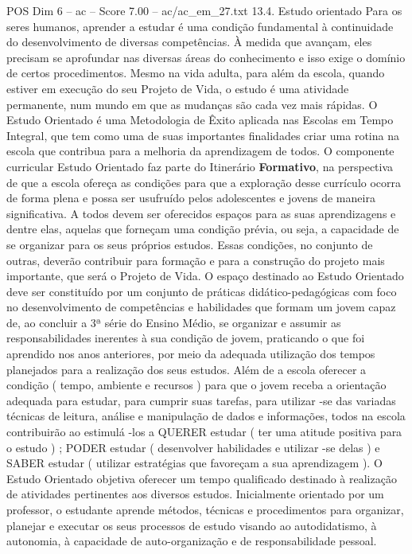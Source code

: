 \begin{textsample}{POS Dim 6 – ac – Score 7.00 – ac/ac\_em\_27.txt}  \label{ex:f6_pos_160}
13.4.
Estudo orientado Para os seres humanos, aprender a estudar é uma condição fundamental à continuidade do desenvolvimento de diversas competências.
À medida que avançam, eles precisam se aprofundar nas diversas áreas do conhecimento e isso exige o domínio de certos procedimentos.
Mesmo na vida adulta, para além da escola, quando estiver em execução do seu Projeto de Vida, o estudo é uma atividade permanente, num mundo em que as mudanças são cada vez mais rápidas.
O Estudo Orientado é uma Metodologia de Êxito aplicada nas Escolas em Tempo Integral, que tem como uma de suas importantes finalidades criar uma rotina na escola que contribua para a melhoria da aprendizagem de todos.
O componente curricular Estudo Orientado faz parte do Itinerário \textbf{Formativo}, na perspectiva de que a escola ofereça as condições para que a exploração desse currículo ocorra de forma plena e possa ser usufruído pelos adolescentes e jovens de maneira significativa.
A todos devem ser oferecidos espaços para as suas aprendizagens e dentre elas, aquelas que forneçam uma condição prévia, ou seja, a capacidade de se organizar para os seus próprios estudos.
Essas condições, no conjunto de outras, deverão contribuir para formação e para a construção do projeto mais importante, que será o Projeto de Vida.
O espaço destinado ao Estudo Orientado deve ser constituído por um conjunto de práticas didático-pedagógicas com foco no desenvolvimento de competências e habilidades que formam um jovem capaz de, ao concluir a 3ª série do Ensino Médio, se organizar e assumir as responsabilidades inerentes à sua condição de jovem, praticando o que foi aprendido nos anos anteriores, por meio da adequada utilização dos tempos planejados para a realização dos seus estudos.
Além de a escola oferecer a condição ( tempo, ambiente e recursos ) para que o jovem receba a orientação adequada para estudar, para cumprir suas tarefas, para utilizar -se das variadas técnicas de leitura, análise e manipulação de dados e informações, todos na escola contribuirão ao estimulá -los a QUERER estudar ( ter uma atitude positiva para o estudo ) ; PODER estudar ( desenvolver habilidades e utilizar -se delas ) e SABER estudar ( utilizar estratégias que favoreçam a sua aprendizagem ).
O Estudo Orientado objetiva oferecer um tempo qualificado destinado à realização de atividades pertinentes aos diversos estudos.
Inicialmente orientado por um professor, o estudante aprende métodos, técnicas e procedimentos para organizar, planejar e executar os seus processos de estudo visando ao autodidatismo, à autonomia, à capacidade de auto-organização e de responsabilidade pessoal.

\end{textsample}
